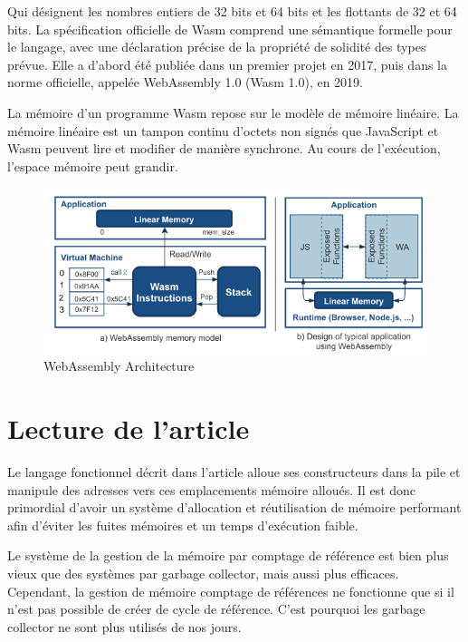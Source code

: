 \documentclass{rapportECL}
\begin{document}
Qui désignent les nombres entiers de 32 bits et 64 bits et les flottants de 32 et 64 bits.  
La spécification officielle de Wasm comprend une sémantique formelle pour le langage, 
avec une déclaration précise de la propriété de solidité des types prévue. 
Elle a d'abord été publiée dans un premier projet en 2017, puis dans la norme officielle, appelée WebAssembly 1.0 (Wasm 1.0), en 2019.
\par La mémoire d’un programme Wasm repose sur le modèle de mémoire linéaire\cite{haas_bringing_2017}. 
La mémoire linéaire est un tampon continu d'octets non signés  que JavaScript et Wasm peuvent lire et modifier de manière synchrone. 
Au cours de l’exécution, l’espace mémoire peut grandir. 

\begin{figure}[ht]
	\centering
	\includegraphics[scale=0.65]{logos/model_memory_wasm.png}	
	\caption{WebAssembly Architecture \cite{noauthor_wasmati_nodate}}
\end{figure}
\FloatBarrier 



\section{Lecture de l'article} \label{section:article}
Le langage fonctionnel décrit dans l'article\cite{ullrich_counting_2020} alloue ses constructeurs dans la pile et manipule des 
adresses vers ces emplacements mémoire alloués. Il est donc primordial d'avoir un système d'allocation et réutilisation de 
mémoire performant afin d'éviter les fuites mémoires et un temps d'exécution faible.

Le système de la gestion de la mémoire par comptage de référence est bien plus vieux que des systèmes par garbage collector, 
mais aussi plus efficaces\cite{ullrich_counting_2020}. Cependant, la gestion de mémoire comptage de références ne fonctionne que si 
il n'est pas possible de créer de cycle de référence. 
C'est pourquoi les garbage collector ne sont plus utilisés de nos jours.
\end{document}
